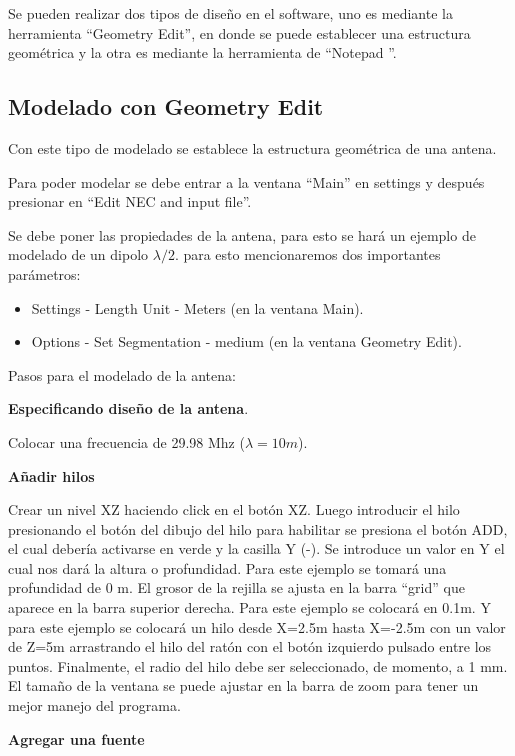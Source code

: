 \documentclass[12pt]{article}
\begin{document}
Se pueden realizar dos tipos de diseño en el software, uno es mediante la
herramienta ``Geometry Edit'', en donde se puede establecer una estructura
geométrica y la otra es mediante la herramienta de ``Notepad ''.

\subsection{Modelado con Geometry Edit}

Con este tipo de modelado se establece la estructura geométrica de una antena.

Para poder modelar se debe entrar a la ventana ``Main'' en settings y despu\'es
presionar en ``Edit NEC and input file''.

Se debe poner las propiedades de la antena, para esto se har\'a un ejemplo de
modelado de un dipolo \(\lambda/2\). para esto mencionaremos dos importantes
par\'ametros:

\begin{itemize}%
    \item Settings - Length Unit - Meters (en la ventana Main).
    \item Options - Set Segmentation - medium (en la ventana Geometry Edit).
\end{itemize}

Pasos para el modelado de la antena:

\textbf{Especificando diseño de la antena}.

Colocar una frecuencia de 29.98 Mhz (\(\lambda=10m\)).

\textbf{Añadir hilos} 

Crear un nivel XZ haciendo click en el bot\'on XZ. Luego introducir el hilo
presionando el bot\'on del dibujo del hilo para habilitar se presiona el
bot\'on ADD, el cual deber\'ia activarse en verde y la casilla Y (-). Se
introduce un valor en Y el cual nos dar\'a la altura o profundidad.  Para este
ejemplo se tomar\'a una profundidad de 0 m. El grosor de la rejilla se ajusta
en la barra ``grid'' que aparece en la barra superior derecha. Para este
ejemplo se colocar\'a en 0.1m. Y para este ejemplo se colocar\'a un hilo desde
X=2.5m hasta X=-2.5m con un valor de Z=5m arrastrando el hilo del rat\'on con
el bot\'on izquierdo pulsado entre los puntos. Finalmente, el radio del hilo
debe ser seleccionado, de momento, a 1 mm. El tamaño de la ventana se puede
ajustar en la barra de zoom para tener un mejor manejo del programa.

\textbf{Agregar una fuente}
\end{document}
